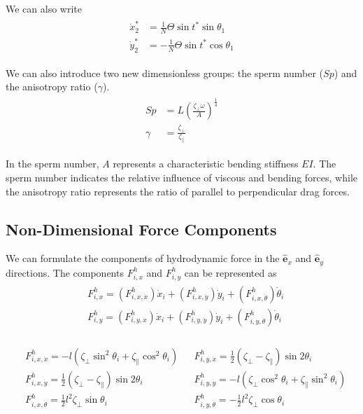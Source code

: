 \documentclass[12pt,letterpaper,titlepage]{article}
\newcommand{\uvec}[1]{\mathbf{\hat{#1}}}
\begin{document}
We can also write
\begin{align}
\begin{split}
\dot{x}_{2}^* &= \frac{1}{N} \Theta \sin t^* \sin \theta_1\\
\dot{y}_{2}^* &= - \frac{1}{N} \Theta \sin t^* \cos \theta_1
\end{split}
\end{align}

We can also introduce two new dimensionless groups: the sperm number ($Sp$) and the anisotropy ratio ($\gamma$).
\begin{align}
\begin{split}
Sp &= L(\frac{\zeta_{\bot} \omega}{A})^\frac{1}{4} \\
\gamma &= \frac{\zeta_{\bot}}{\zeta_{\parallel}}
\end{split}
\end{align}

In the sperm number, $A$ represents a characteristic bending stiffness $EI$. The sperm number indicates the relative influence of viscous and bending forces, while the anisotropy ratio represents the ratio of parallel to perpendicular drag forces.

\newpage

\subsection{Non-Dimensional Force Components}
We can formulate the components of hydrodynamic force in the $\uvec{e}_x$ and $\uvec{e}_y$ directions. The components $F_{i,x}^h$ and $F_{i,y}^h$ can be represented as
\begin{align}
\begin{split}
&F_{i,x}^h = (F_{i,x,\dot{x}}^h) \dot{x}_i + (F_{i,x,\dot{y}}^h) \dot{y}_i + (F_{i,x,\dot{\theta}}^h) \dot{\theta}_i \\
&F_{i,y}^h = (F_{i,y,\dot{x}}^h) \dot{x}_i + (F_{i,y,\dot{y}}^h) \dot{y}_i + (F_{i,y,\dot{\theta}}^h) \dot{\theta}_i \\
\end{split}
\end{align}

\begin{align*}
&F_{i,x,\dot{x}}^h = - l (\zeta_{\bot} \sin^2 \theta_i + \zeta_{\parallel} \cos^2 \theta_i) & &F_{i,y,\dot{x}}^h =\frac{1}{2} (\zeta_{\bot} - \zeta_{\parallel} ) \sin 2 \theta_i \\
&F_{i,x,\dot{y}}^h = \frac{1}{2} (\zeta_{\bot} - \zeta_{\parallel} ) \sin 2 \theta_i & &F_{i,y,\dot{y}}^h =  - l (\zeta_{\bot} \cos^2 \theta_i + \zeta_{\parallel} \sin^2 \theta_i) \\
&F_{i,x,\dot{\theta}}^h = \frac{1}{2} l^2 \zeta_{\bot} \sin \theta_i & &F_{i,y,\dot{\theta}}^h = - \frac{1}{2} l^2 \zeta_{\bot} \cos \theta_i
\end{align*}
\end{document}
